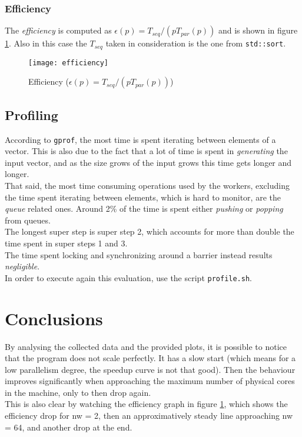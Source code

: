 \documentclass[]{article}
\def\code#1{\texttt{#1}}
\begin{document}
\subsubsection{Efficiency}
The \emph{efficiency} is computed as $\epsilon(p) = T_{seq}/(pT_{par}(p))$ and is shown in figure \ref{fig:effic}. Also in this case the $T_{seq}$ taken in consideration is the one from \code{std::sort}.
\begin{figure}[H]
	\centering
	\texttt{[image: efficiency]}
	\caption{Efficiency ($\epsilon(p) = T_{seq}/(pT_{par}(p))$)}
	\label{fig:effic}
\end{figure}

\subsection{Profiling}
\label{sec:profile}
According to \code{gprof}, the most time is spent iterating between elements of a vector. This is also due to the fact that a lot of time is spent in \emph{generating} the input vector, and as the size grows of the input grows this time gets longer and longer. \\
That said, the most time consuming operations used by the workers, excluding the time spent iterating between elements, which is hard to monitor, are the \emph{queue} related ones.
Around 2\% of the time is spent either \emph{pushing} or \emph{popping} from queues. \\
The longest super step is super step 2, which accounts for more than double the time spent in super steps 1 and 3.\\
The time spent locking and synchronizing around a barrier instead results \emph{negligible}. \\
In order to execute again this evaluation, use the script \code{profile.sh}.

\section{Conclusions}
\label{sec:conclusion}
By analysing the collected data and the provided plots, it is possible to notice that the program does not scale perfectly. It has a slow start (which means for a low parallelism degree, the speedup curve is not that good). Then the behaviour improves significantly when approaching the maximum number of physical cores in the machine, only to then drop again. \\
This is also clear by watching the efficiency graph in figure \ref{fig:effic}, which shows the efficiency drop for nw = 2, then an approximatively steady line approaching nw = 64, and another drop at the end.
\end{document}
